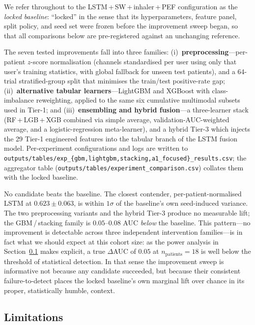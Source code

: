 \documentclass[11pt,a4paper]{article}
\begin{document}
We refer throughout to the LSTM\,+\,SW\,+\,inhaler\,+\,PEF configuration
as the \emph{locked baseline}: ``locked'' in the sense that its
hyperparameters, feature panel, split policy, and seed set were frozen
before the improvement sweep began, so that all comparisons below are
pre-registered against an unchanging reference.

The seven tested improvements fall into three families:
(i)~\textbf{preprocessing}---per-patient $z$-score normalisation
(channels standardised per user using only that user's training
statistics, with global fallback for unseen test patients), and a
64-trial stratified-group split that minimises the train/test
positive-rate gap;
(ii)~\textbf{alternative tabular learners}---LightGBM and XGBoost
with class-imbalance reweighting, applied to the same six cumulative
multimodal subsets used in Tier-1; and
(iii)~\textbf{ensembling and hybrid fusion}---a three-learner stack
(RF\,+\,LGB\,+\,XGB combined via simple average, validation-AUC-weighted
average, and a logistic-regression meta-learner), and a hybrid Tier-3
which injects the 29 Tier-1 engineered features into the tabular
branch of the LSTM fusion model.  Per-experiment configurations and
logs are written to
\texttt{outputs/tables/exp\_\{gbm,lightgbm,stacking,a1\_focused\}\_results.csv};
the aggregator table
(\texttt{outputs/tables/experiment\_comparison.csv}) collates them with
the locked baseline.

No candidate beats the baseline.  The closest contender,
per-patient-normalised LSTM at $0.623\pm0.063$, is within $1\sigma$ of
the baseline's own seed-induced variance.  The two preprocessing
variants and the hybrid Tier-3 produce no measurable lift; the
GBM\,/\,stacking family is $0.05$--$0.08$ AUC \emph{below} the
baseline.  This pattern---no improvement is detectable across three
independent intervention families---is in fact what we should expect at
this cohort size: as the power analysis in
Section~\ref{sec:limitations} makes explicit, a true $\Delta$AUC of
$0.05$ at $n_\text{patients}{=}18$ is well below the threshold of
statistical detection.  In that sense the improvement sweep is
informative not because any candidate succeeded, but because their
consistent failure-to-detect places the locked baseline's own marginal
lift over chance in its proper, statistically humble, context.

\subsection{Limitations}\label{sec:limitations}
\end{document}
